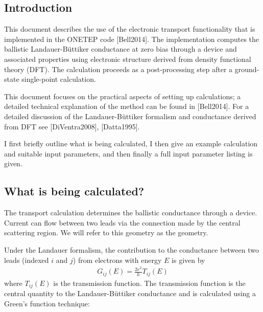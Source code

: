 \documentclass[letterpaper,10pt,english]{sphinxmanual}
\begin{document}
\subsection{Introduction}
\label{\detokenize{transport:introduction}}
This document describes the use of the electronic transport
functionality that is implemented in the ONETEP
code {[}Bell2014{]}. The implementation computes the
ballistic Landauer-Büttiker conductance at zero bias through a device
and associated properties using electronic structure derived from
density functional theory (DFT). The calculation proceeds as a
post-processing step after a ground-state single-point calculation.

This document focuses on the practical aspects of setting up
calculations; a detailed technical explanation of the method can be
found in {[}Bell2014{]}. For a detailed discussion
of the Landauer-Büttiker formalism and conductance derived from DFT see
{[}DiVentra2008{]}, {[}Datta1995{]}.

I first briefly outline what is being calculated, I then give an example
calculation and suitable input parameters, and then finally a full input
parameter listing is given.


\subsection{What is being calculated?}
\label{\detokenize{transport:what-is-being-calculated}}
The transport calculation determines the ballistic conductance through a
device. Current can flow between two leads via the connection made by
the central scattering region. We will refer to this geometry as the
 geometry.

Under the Landauer formalism, the contribution to the conductance
between two leads (indexed \(i\) and \(j\)) from electrons with
energy \(E\) is given by
\begin{equation*}
\begin{split}G_{ij}(E) = \frac{2e^2}{h} T_{ij}(E)\end{split}
\end{equation*}
where \(T_{ij}(E)\) is the transmission function. The transmission
function is the central quantity to the Landauer-Büttiker conductance
and is calculated using a Green’s function technique:
\end{document}
